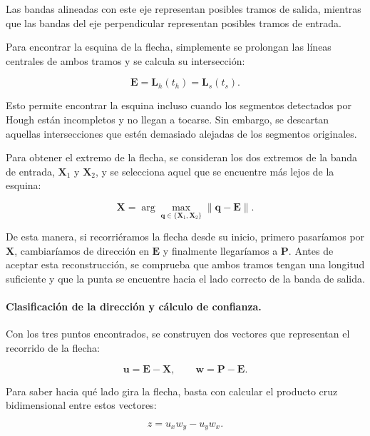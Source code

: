 \documentclass[11pt,a4paper]{article}
\begin{document}
Las bandas alineadas con este eje representan posibles tramos de salida, mientras que las bandas del eje perpendicular representan posibles tramos de entrada.

Para encontrar la esquina de la flecha, simplemente se prolongan las líneas centrales de ambos tramos y se calcula su intersección:

\begin{equation}
    \mathbf E=
    \mathbf L_h(t_h)=
    \mathbf L_s(t_s).
\end{equation}

Esto permite encontrar la esquina incluso cuando los segmentos detectados por Hough están incompletos y no llegan a tocarse. Sin embargo, se descartan aquellas intersecciones que estén demasiado alejadas de los segmentos originales.

Para obtener el extremo de la flecha, se consideran los dos extremos de la banda de entrada, $\mathbf X_1$ y $\mathbf X_2$, y se selecciona aquel que se encuentre más lejos de la esquina:

\begin{equation}
    \mathbf X=
    \arg\max_{\mathbf q\in\{\mathbf X_1,\mathbf X_2\}}
    \|\mathbf q-\mathbf E\|.
\end{equation}

De esta manera, si recorriéramos la flecha desde su inicio, primero pasaríamos por $\mathbf X$, cambiaríamos de dirección en $\mathbf E$ y finalmente llegaríamos a $\mathbf P$. Antes de aceptar esta reconstrucción, se comprueba que ambos tramos tengan una longitud suficiente y que la punta se encuentre hacia el lado correcto de la banda de salida.


\paragraph{Clasificación de la dirección y cálculo de confianza.}

Con los tres puntos encontrados, se construyen dos vectores que representan el recorrido de la flecha:

\begin{equation}
    \mathbf u=\mathbf E-\mathbf X,
    \qquad
    \mathbf w=\mathbf P-\mathbf E.
\end{equation}

Para saber hacia qué lado gira la flecha, basta con calcular el producto cruz bidimensional entre estos vectores:

\begin{equation}
    z=u_xw_y-u_yw_x.
\end{equation}
\end{document}

